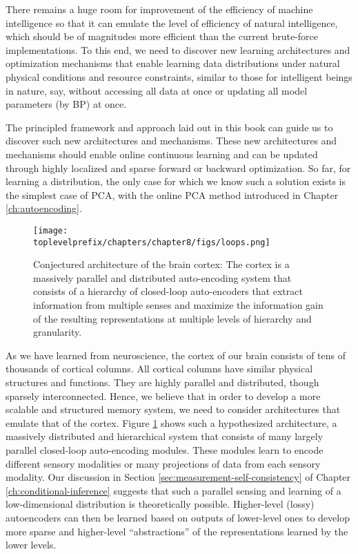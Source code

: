 \documentclass[../../book-main.tex]{subfiles}
\begin{document}
There remains a huge room for  improvement of the efficiency of   machine intelligence so that it can emulate the level of efficiency of natural intelligence, which should be of magnitudes more efficient than the current brute-force implementations. To this end, we need to discover new learning architectures and optimization mechanisms that enable learning data distributions under natural physical conditions and resource constraints, similar to those for intelligent beings in nature, say, without accessing all data at once or updating all model parameters (by BP) at once. 

The principled framework and approach laid out in this book can guide us to discover such new architectures and mechanisms.  These new architectures and mechanisms should enable online continuous learning and can be updated through highly localized and sparse forward or backward optimization. So far, for learning a distribution, the only case for which we know such a solution exists is the simplest case of PCA, with the online PCA method introduced in Chapter \ref{ch:autoencoding}.  

\begin{figure}[t]
\centering
\texttt{[image: \\toplevelprefix/chapters/chapter8/figs/loops.png]}
    \caption{Conjectured architecture of the brain cortex: The cortex is a massively parallel and distributed auto-encoding system that consists of a hierarchy of closed-loop auto-encoders that extract information from multiple senses and maximize the information  gain of the resulting representations at multiple levels of hierarchy and granularity.}
    \label{fig:loops}
\end{figure}
As we have learned from neuroscience, the cortex of our brain consists of tens of thousands of cortical columns. All cortical columns have similar physical structures and functions. They are highly parallel and distributed, though sparsely interconnected. Hence, we believe that in order to develop a more scalable and structured memory system, we need to consider architectures that emulate that of the cortex. Figure \ref{fig:loops} shows such a hypothesized architecture, a massively distributed and hierarchical system that consists of many largely parallel closed-loop auto-encoding modules. These modules learn to encode different sensory modalities or many projections of data from each sensory modality. Our discussion in Section \ref{sec:measurement-self-consistency} of Chapter \ref{ch:conditional-inference} suggests that such a parallel sensing and learning of a low-dimensional distribution is theoretically possible. Higher-level (lossy) autoencoders can then be learned based on outputs of lower-level ones to develop more sparse and higher-level  ``abstractions'' of the representations learned by the lower levels. 
\end{document}
